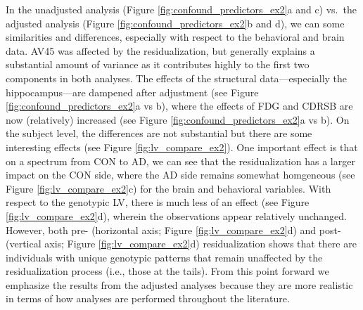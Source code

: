 \documentclass[12pt]{article}
\begin{document}
In the unadjusted analysis (Figure \ref{fig:confound_predictors_ex2}a
and c) vs.~the adjusted analysis (Figure
\ref{fig:confound_predictors_ex2}b and d), we can some similarities and
differences, especially with respect to the behavioral and brain data.
AV45 was affected by the residualization, but generally explains a
substantial amount of variance as it contributes highly to the first two
components in both analyses. The effects of the structural
data---especially the hippocampus---are dampened after adjustment (see
Figure \ref{fig:confound_predictors_ex2}a vs b), where the effects of
FDG and CDRSB are now (relatively) increased (see Figure
\ref{fig:confound_predictors_ex2}a vs b). On the subject level, the
differences are not substantial but there are some interesting effects
(see Figure \ref{fig:lv_compare_ex2}). One important effect is that on a
spectrum from CON to AD, we can see that the residualization has a
larger impact on the CON side, where the AD side remains somewhat
homgeneous (see Figure \ref{fig:lv_compare_ex2}c) for the brain and
behavioral variables. With respect to the genotypic LV, there is much
less of an effect (see Figure \ref{fig:lv_compare_ex2}d), wherein the
observations appear relatively unchanged. However, both pre- (horizontal
axis; Figure \ref{fig:lv_compare_ex2}d) and post- (vertical axis; Figure
\ref{fig:lv_compare_ex2}d) residualization shows that there are
individuals with unique genotypic patterns that remain unaffected by the
residualization process (i.e., those at the tails). From this point
forward we emphasize the results from the adjusted analyses because they
are more realistic in terms of how analyses are performed throughout the
literature.
\end{document}
